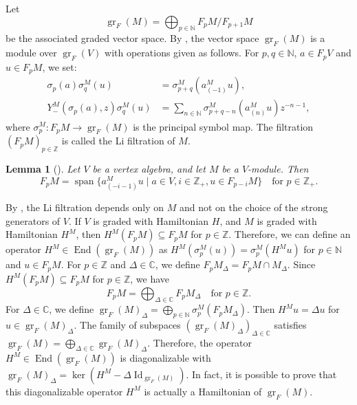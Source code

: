 \documentclass[a4paper, 12pt, reqno]{amsart}
\newtheorem{lemma}[theorem]{Lemma}
\theoremstyle{remark}
\DeclareMathOperator{\gr}{gr}
\DeclareMathOperator{\vspan}{span}
\DeclareMathOperator{\End}{End}
\DeclareMathOperator{\Id}{Id}
\begin{document}
Let
\begin{equation*}
  \gr_F(M) = \bigoplus_{p \in \mathbb{N}}F_pM/F_{p + 1}M
\end{equation*}
be the associated graded vector space.
By \cite{li_abelianizing_2005}, the vector space $\gr_F(M)$ is a module over $\gr_F(V)$ with operations given as follows.
For $p, q \in \mathbb{N}$, $a \in F_pV$ and $u \in F_pM$, we set:
\begin{align*}
  \sigma_p(a)\sigma^M_q(u) &= \sigma^M_{p + q}(a^M_{(-1)}u), \\
  Y^M_-(\sigma_p(a), z)\sigma^M_q(u) &= \sum_{n \in \mathbb{N}}\sigma^M_{p + q - n}(a^M_{(n)}u)z^{-n - 1},
\end{align*}
where $\sigma^M_p: F_pM \to \gr_F(M)$ is the principal symbol map.
The filtration $(F_pM)_{p \in \mathbb{Z}}$ is called the Li filtration of $M$.

\begin{lemma}[{\cite[Lemma 2.9]{li_abelianizing_2005}}]
  \label{lmm:5}
  Let $V$ be a vertex algebra, and let $M$ be a $V$-module.
  Then
  \begin{equation*}
    F_pM = \vspan\{a^M_{(-i - 1)}u \mid a \in V, i \in \mathbb{Z}_+, u \in F_{p - i}M\} \quad \text{for $p \in \mathbb{Z}_+$}.
  \end{equation*}
\end{lemma}

By , the Li filtration depends only on $M$ and not on the choice of the strong generators of $V$.
If $V$ is graded with Hamiltonian $H$, and $M$ is graded with Hamiltonian $H^M$, then $H^M(F_pM) \subseteq F_pM$ for $p \in \mathbb{Z}$.
Therefore, we can define an operator $H^M \in \End(\gr_F(M))$ as $H^M(\sigma^M_p(u)) = \sigma^M_p(H^Mu)$ for $p \in \mathbb{N}$ and $u \in F_pM$.
For $p \in \mathbb{Z}$ and $\Delta \in \mathbb{C}$, we define $F_pM_{\Delta} = F_pM \cap M_{\Delta}$.
Since $H^M(F_pM) \subseteq F_pM$ for $p \in \mathbb{Z}$, we have
\begin{equation*}
  F_pM = \bigoplus_{\Delta \in \mathbb{C}}F_pM_{\Delta} \quad \text{for $p \in \mathbb{Z}$}.
\end{equation*}
For $\Delta \in \mathbb{C}$, we define $\gr_F(M)_{\Delta} = \bigoplus_{p \in \mathbb{N}}\sigma^M_p(F_pM_{\Delta})$.
Then $H^Mu = \Delta u$ for $u \in \gr_F(M)_{\Delta}$.
The family of subspaces $(\gr_F(M)_{\Delta})_{\Delta \in \mathbb{C}}$ satisfies $\gr_F(M) = \bigoplus_{\Delta \in \mathbb{C}}\gr_F(M)_{\Delta}$.
Therefore, the operator $H^M \in \End(\gr_F(M))$ is diagonalizable with $\gr_F(M)_{\Delta} = \ker(H^M - \Delta\Id_{\gr_F(M)})$.
In fact, it is possible to prove that this diagonalizable operator $H^M$ is actually a Hamiltonian of $\gr_F(M)$.
\end{document}
